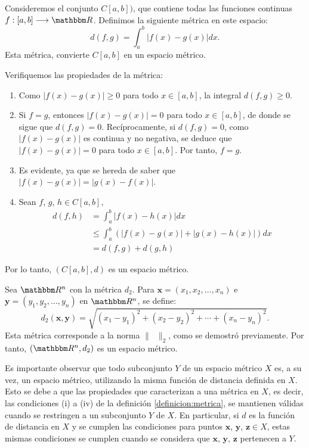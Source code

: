 \begin{examplebox}{}{}
    Consideremos el conjunto $C[a, b])$, que contiene todas las funciones continuas $f: [a, b] \longrightarrow \RR$. Definimos la siguiente métrica en este espacio:
    $$d(f, g) = \int_{a}^{b} |f(x) - g(x)|  dx.$$
    Esta métrica, convierte $C[a, b]$ en un espacio métrico.

    \tcblower
    \demostracion Verifiquemos las propiedades de la métrica:
    \begin{enumerate}[label=\roman*), topsep=6pt, itemsep=0pt]
        \item Como $|f(x) - g(x)| \geq 0$ para todo $x \in [a, b]$, la integral $d(f, g) \geq 0$.
        \item Si $f = g$, entonces $|f(x) - g(x)| = 0$ para todo $x \in [a, b]$, de donde se sigue que $d(f, g) = 0$. Recíprocamente, si $d(f, g) = 0$, como $|f(x) - g(x)|$ es continua y no negativa, se deduce que $|f(x) - g(x)| = 0$ para todo $x \in [a, b]$. Por tanto, $f = g$.
        \item Es evidente, ya que se hereda de saber que $|f(x) - g(x)| = |g(x) - f(x)|$.
        \item Sean $f$, $g$, $h \in C[a, b]$,
        \begin{align*}
            d(f, h) & = \int_{a}^{b} |f(x) - h(x)| dx \\
            & \leq \int_{a}^{b} \left( |f(x) - g(x)| + |g(x) - h(x)| \right) dx \\
            & = d(f, g) + d(g, h)
        \end{align*}
    \end{enumerate}
    Por lo tanto, $(C[a, b], d)$ es un espacio métrico.
\end{examplebox}

\newpage

\begin{examplebox}{}{}
    Sea $\RR[n]$ con la métrica $d_2$. Para $\mathbf{x} = (x_1, x_2, \dots, x_n)$ e $\mathbf{y} = (y_1, y_2, \dots, y_n)$ en $\RR[n]$, se define:
    $$d_2(\mathbf{x}, \mathbf{y}) = \sqrt{(x_1 - y_1)^2 + (x_2 - y_2)^2 + \cdots + (x_n - y_n)^2}.$$
    Esta métrica corresponde a la norma $\| \phantom{x} \|_2$, como se demostró previamente. Por tanto, $(\RR[n], d_2)$ es un espacio métrico.
\end{examplebox}

Es importante observar que todo subconjunto $Y$ de un espacio métrico $X$ es, a su vez, un espacio métrico, utilizando la misma función de distancia definida en $X$. Esto se debe a que las propiedades que caracterizan a una métrica en $X$, es decir, las condiciones (i) a (iv) de la definición \ref{definicion:metrica}, se mantienen válidas cuando se restringen a un subconjunto $Y$ de $X$. En particular, si $d$ es la función de distancia en $X$ y se cumplen las condiciones para puntos $\mathbf{x}$, $\mathbf{y}$, $\mathbf{z} \in X$, estas mismas condiciones se cumplen cuando se considera que $\mathbf{x}$, $\mathbf{y}$, $\mathbf{z}$ pertenecen a $Y$.

